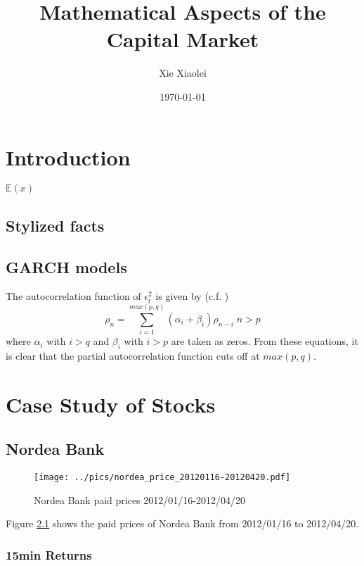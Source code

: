 \documentclass{book}
\title{Mathematical Aspects of the Capital Market}
\author{Xie Xiaolei}
\date{\today}
\begin{document}
\maketitle
\tableofcontents

\chapter{Introduction}
$\mathbb{E}(x)$

\section{Stylized facts}

\section{GARCH models}
The autocorrelation function of $\epsilon_t^2$ is given by
(c.f. \cite{Bollerslev87})
$$
\rho_n = \sum_{i=1}^{max(p,q)} (\alpha_i + \beta_i) \rho_{n-i}
\;n > p
$$
where $\alpha_i$ with $i > q$ and $\beta_i$ with $i > p$ are taken as
zeros. From these equations, it is clear that the partial
autocorrelation function cuts off at $max(p, q)$.


\chapter{Case Study of Stocks}
\section{Nordea Bank}
\begin{figure}[ht]
  \centering
  \texttt{[image: ../pics/nordea\_price\_20120116-20120420.pdf]}
  \caption{Nordea Bank paid prices 2012/01/16-2012/04/20}
  \label{fig:Nordea}
\end{figure}
Figure \ref{fig:Nordea} shows the paid prices of Nordea Bank from
2012/01/16 to 2012/04/20.

\subsection{15min Returns}
\end{document}
